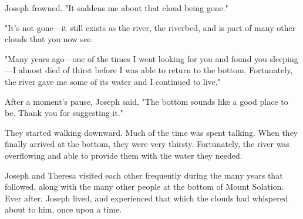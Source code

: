 Joseph frowned. "It saddens me about that cloud being gone."

"It's not gone—it still exists as the river, the riverbed, and is part of many other clouds that you now see.

"Many years ago—one of the times I went looking for you and found you sleeping—I almost died of thirst before I was able to return to the bottom. Fortunately, the river gave me some of its water and I continued to live."

After a moment's pause, Joseph said, "The bottom sounds like a good place to be. Thank you for suggesting it."

They started walking downward. Much of the time was spent talking. When they finally arrived at the bottom, they were very thirsty. Fortunately, the river was overflowing and able to provide them with the water they needed.

Joseph and Theresa visited each other frequently during the many years that followed, along with the many other people at the bottom of Mount Solation. Ever after, Joseph lived, and experienced that which the clouds had whispered about to him, once upon a time.